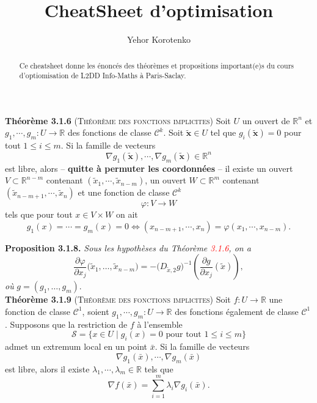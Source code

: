 \documentclass[a4paper]{article}
\title{CheatSheet d'optimisation}
\author{Yehor Korotenko}
\begin{document}
\maketitle
\begin{abstract}
    Ce cheatsheet donne les énoncés des théorèmes et propositions important(e)s du cours d'optiomisation de L2DD Info-Maths à Paris-Saclay.
\end{abstract}

\textbf{Théorème 3.1.6} (\textsc{Théorème des fonctions implicites}) Soit $U$
un ouvert de $\mathbb{R}^n$ et $g_1, \cdots, g_m : U \rightarrow \mathbb{R}$
des fonctions de classe $\mathcal{C}^k$. Soit $\bm{\tilde{x}} \in U$ tel que
$g_i(\bm{\tilde{x}}) = 0$ pour tout $1 \leq i \leq m$. Si la famille de
vecteurs
\[
\nabla g_1(\bm{\tilde{x}}), \cdots, \nabla g_m(\bm{\tilde{x}}) \in \mathbb{R}^n
\]
est libre, alors -- \textbf{quitte à permuter les coordonnées} -- il existe un ouvert $V \subset \mathbb{R}^{n - m}$ contenant $(\tilde{x}_1, \cdots, \tilde{x}_{n - m})$, un ouvert $W \subset \mathbb{R}^m$ contenant $(\tilde{x}_{n - m + 1}, \cdots, \tilde{x}_n)$ et une fonction de classe $\mathcal{C}^k$
\[
\varphi : V \rightarrow W
\]
tels que pour tout $x \in V \times W$ on ait
\[
g_1(x) = \cdots = g_m(x) = 0 \iff (x_{n - m + 1}, \cdots, x_n) = \varphi(x_1, \cdots, x_{n - m}).
\]

\noindent\textbf{Proposition 3.1.8.} \textit{Sous les hypothèses du Théorème \textcolor{red}{3.1.6}, on a}
\[
\frac{\partial \varphi}{\partial x_j}\bigl(\tilde{x}_1,\dots,\tilde{x}_{n-m}\bigr)
= -\bigl(D_{\tilde{x},2}g\bigr)^{-1}
\left(\frac{\partial g}{\partial x_j}(\tilde{x})\right),
\]
\textit{où } \(g=(g_1,\dots,g_m)\). \\

\textbf{Théorème 3.1.9} (\textsc{Théorème des fonctions implicites}) Soit $f : U \to \mathbb{R}$ une fonction de classe $\mathcal{C}^1$, soient $g_1, \cdots, g_m : U \to \mathbb{R}$ des fonctions également de classe $\mathcal{C}^1$. Supposons que la restriction de $f$ à l’ensemble
\[
\mathcal{S} = \{ x \in U \mid g_i(x) = 0 \text{ pour tout } 1 \leq i \leq m \}
\]
admet un extremum local en un point $\bar{x}$. Si la famille de vecteurs
\[
\nabla g_1(\bar{x}), \cdots, \nabla g_m(\bar{x})
\]
est libre, alors il existe $\lambda_1, \cdots, \lambda_m \in \mathbb{R}$ tels que
\[
\nabla f(\bar{x}) = \sum_{i=1}^{m} \lambda_i \nabla g_i(\bar{x}).
\]

    
\end{document}
